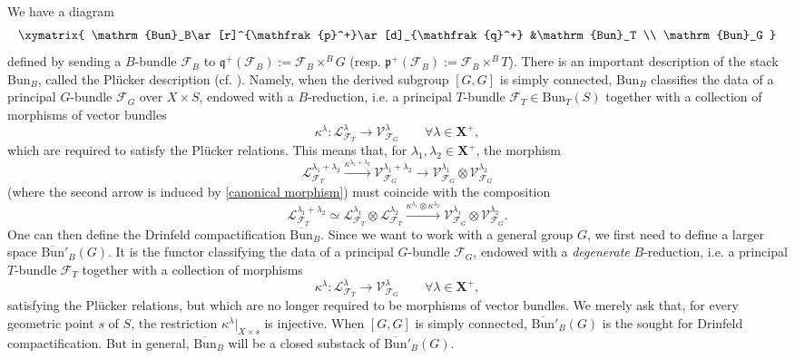\documentclass[11pt]{amsart}
\theoremstyle{plain}
\theoremstyle{remark}
\numberwithin{equation}{section}
\begin{document}
	We have a diagram
	\begin{equation*}
		\xymatrix{
			\mathrm{Bun}_B\ar[r]^{\mathfrak{p}^+}\ar[d]_{\mathfrak{q}^+} &\mathrm{Bun}_T  \\
			\mathrm{Bun}_G
		}
	\end{equation*}
	defined by sending a $B$-bundle $\mathcal{F}_B$ to $\mathfrak{q}^+(\mathcal{F}_B):=\mathcal{F}_B\times^{B}G$ (resp. $\mathfrak{p}^+(\mathcal{F}_B):=\mathcal{F}_B\times^{B}T$). There is an important description of the stack $\mathrm{Bun}_B$, called the Pl\"ucker description (cf. \cite[§1.2.1]{BG}). Namely, when the derived subgroup $[G,G]$ is simply connected, $\mathrm{Bun}_B$ classifies the data of a principal $G$-bundle $\mathcal{F}_G$ over $X\times S$, endowed with a $B$-reduction, i.e. a principal $T$-bundle $\mathcal{F}_T\in\mathrm{Bun}_T(S)$ together with a collection of morphisms of vector bundles
	$$\kappa^\lambda:\mathcal{L}_{\mathcal{F}_T}^\lambda\to \mathcal{V}_{\mathcal{F}_G}^\lambda\qquad\forall \lambda\in \mathbf{X}^+,$$
	which are required to satisfy the Pl\"ucker relations. This means that, for $\lambda_1,\lambda_2\in\mathbf{X}^+$, the morphism
	$$\mathcal{L}_{\mathcal{F}_T}^{\lambda_1+\lambda_2}\xrightarrow{\kappa^{\lambda_1+\lambda_2}} \mathcal{V}_{\mathcal{F}_G}^{\lambda_1+\lambda_2}\to \mathcal{V}_{\mathcal{F}_G}^{\lambda_1}\otimes \mathcal{V}_{\mathcal{F}_G}^{\lambda_2} $$
	(where the second arrow is induced by \eqref{canonical morphism}) must coincide with the composition
	$$\mathcal{L}_{\mathcal{F}_T}^{\lambda_1+\lambda_2}\simeq \mathcal{L}_{\mathcal{F}_T}^{\lambda_1}\otimes \mathcal{L}_{\mathcal{F}_T}^{\lambda_2}\xrightarrow{\kappa^{\lambda_1}\otimes \kappa^{\lambda_2}}  \mathcal{V}_{\mathcal{F}_G}^{\lambda_1}\otimes \mathcal{V}_{\mathcal{F}_G}^{\lambda_2}.  $$
	One can then define the Drinfeld compactification $\overline{\mathrm{Bun}}_B$. Since we want to work with a general group $G$, we first need to define a larger space $\overline{\mathrm{Bun}}'_B(G)$. It is the functor classifying the data of a principal $G$-bundle $\mathcal{F}_G$, endowed with a \textit{degenerate} $B$-reduction, i.e. a principal $T$-bundle $\mathcal{F}_T$ together with a collection of morphisms 
	$$\kappa^\lambda:\mathcal{L}_{\mathcal{F}_T}^\lambda\to \mathcal{V}_{\mathcal{F}_G}^\lambda\qquad\forall \lambda\in \mathbf{X}^+,$$
	satisfying the Pl\"ucker relations, but which are no longer required to be morphisms of vector bundles. We merely ask that, for every geometric point $s$ of $S$, the restriction $\kappa^\lambda|_{X\times s}$ is injective.  When $[G,G]$ is simply connected, $\overline{\mathrm{Bun}}'_B(G)$ is the sought for Drinfeld compactification. But in general, $\overline{\mathrm{Bun}}_B$ will be a closed substack of $\overline{\mathrm{Bun}}'_B(G)$.
	
\end{document}
